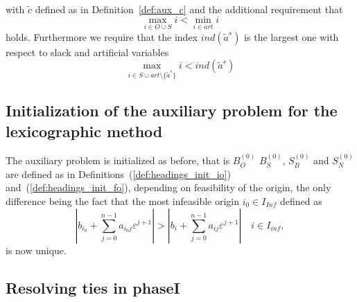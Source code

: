 \documentclass[a4paper]{article}
\begin{document}
with $\tilde{c}$ defined as in Definition~\ref{def:aux_c} and the additional
requirement that 
\begin{equation}
\label{req:order_eps}
\max_{i \in O \cup S}i < \min_{i \in art}i
\end{equation} 
holds. Furthermore we require that the index $ind(\tilde{a}^{s})$ is
the largest one with respect to slack and artificial variables
\begin{equation}
\label{req:order_eps_spec_art}
\max_{i \in S \cup art \setminus \{\tilde{a}^{s} \}}i < ind(\tilde{a}^{s})
\end{equation} 

\subsection{Initialization of the auxiliary problem for the lexicographic
method}
The auxiliary problem is initialized as before, that is $B_{O}^{(0)}$
$B_{S}^{(0)}$, $S_{B}^{(0)}$ and $S_{N}^{(0)}$ are defined as in
Definitions~(\ref{def:headings_init_io}) and~(\ref{def:headings_init_fo}),
depending on feasibility of the origin, the only difference being
the fact that the most infeasible origin $i_{0} \in I_{Inf}$ defined as
\begin{equation*}
  \left|b_{i_{0}} + \sum_{j=0}^{n-1}a_{i_{0}j}\varepsilon^{j+1} \right|
    >
    \left|b_{i} + \sum_{j=0}^{n-1}a_{ij}\varepsilon^{j+1} \right|
    \quad i \in I_{inf},
\end{equation*}
is now unique.

\subsection{Resolving ties in phaseI}
\label{sec:Res_ties_phaseI}
\end{document}
